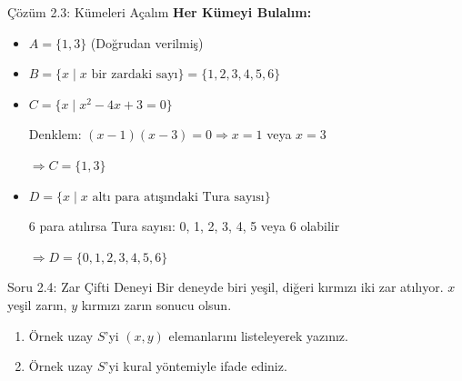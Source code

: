 \documentclass[light]{lutbeamer}
\begin{document}
\begin{frame}{Çözüm 2.3: Kümeleri Açalım}
    \color{blue}
    \textbf{Her Kümeyi Bulalım:}
    
    \begin{itemize}
        \item $A = \{1, 3\}$ (Doğrudan verilmiş)
        
        \item $B = \{x \mid x \text{ bir zardaki sayı}\} = \{1, 2, 3, 4, 5, 6\}$
        
        \item $C = \{x \mid x^2 - 4x + 3 = 0\}$
        
        Denklem: $(x-1)(x-3) = 0 \Rightarrow x = 1$ veya $x = 3$
        
        $\Rightarrow C = \{1, 3\}$
        
        \item $D = \{x \mid x \text{ altı para atışındaki Tura sayısı}\}$
        
        6 para atılırsa Tura sayısı: 0, 1, 2, 3, 4, 5 veya 6 olabilir
        
        $\Rightarrow D = \{0, 1, 2, 3, 4, 5, 6\}$
    \end{itemize}
    
    \vspace{0.3cm}
    \begin{center}
    \end{center}
\end{frame}

\begin{frame}{Soru 2.4: Zar Çifti Deneyi}
    Bir deneyde biri yeşil, diğeri kırmızı iki zar atılıyor. $x$ yeşil zarın, $y$ kırmızı zarın sonucu olsun.
    \begin{enumerate}
        \item Örnek uzay $S$'yi $(x, y)$ elemanlarını listeleyerek yazınız.
        \item Örnek uzay $S$'yi kural yöntemiyle ifade ediniz.
    \end{enumerate}
\end{frame}
\end{document}
